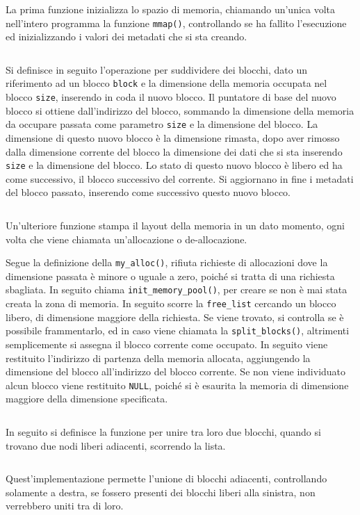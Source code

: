 \documentclass{article}
\numberwithin{equation}{subsection}
\begin{document}
La prima funzione inizializza lo spazio di memoria, chiamando un'unica volta nell'intero programma la funzione \verb|mmap()|, controllando se ha fallito l'esecuzione ed inizializzando 
i valori dei metadati che si sta creando. 
\inputminted[firstline=30,lastline=44,breaklines, breakanywhere]{c}{./Esercitazione del 19-11-24/domanda4.c}

Si definisce in seguito l'operazione per suddividere dei blocchi, dato un riferimento ad un blocco \verb|block| e la dimensione della memoria occupata nel blocco \verb|size|, inserendo in coda il nuovo blocco.  
Il puntatore di base del nuovo blocco si ottiene dall'indirizzo del blocco, sommando la dimensione della memoria da occupare passata come parametro \verb|size| e la dimensione del blocco. La dimensione di questo nuovo blocco è la dimensione rimasta, dopo aver rimosso dalla dimensione corrente del blocco la dimensione dei dati che si sta inserendo \verb|size| e la dimensione del blocco. Lo stato di questo nuovo blocco è libero ed ha come successivo, il blocco 
successivo del corrente. Si aggiornano in fine i metadati del blocco passato, inserendo come successivo questo nuovo blocco. 
\inputminted[firstline=47,lastline=56]{c}{./Esercitazione del 19-11-24/domanda4.c}


Un'ulteriore funzione stampa il layout della memoria in un dato momento, ogni volta che viene 
chiamata un'allocazione o de-allocazione. 

Segue la definizione della \verb|my_alloc()|, rifiuta richieste di allocazioni dove la dimensione passata è minore o uguale a zero, poiché si tratta di una richiesta sbagliata. In seguito chiama \verb|init_memory_pool()|, per creare se non è mai stata creata la zona di memoria. 
In seguito scorre la \verb|free_list| cercando un blocco libero, di dimensione maggiore della richiesta. Se viene trovato, si controlla se è possibile frammentarlo, ed in caso viene chiamata la \verb|split_blocks()|, altrimenti semplicemente si assegna il blocco corrente come occupato. 
In seguito viene restituito l'indirizzo di partenza della memoria allocata, aggiungendo la dimensione del blocco all'indirizzo del blocco corrente. 
Se non viene individuato alcun blocco viene restituito \verb|NULL|, poiché si è esaurita la memoria di dimensione maggiore della dimensione specificata. 
\inputminted[firstline=70,lastline=89]{c}{./Esercitazione del 19-11-24/domanda4.c}

In seguito si definisce la funzione per unire tra loro due blocchi, quando si trovano due nodi 
liberi adiacenti, scorrendo la lista. 
\inputminted[firstline=91,lastline=96]{c}{./Esercitazione del 19-11-24/domanda4.c}
Quest'implementazione permette l'unione di blocchi adiacenti, controllando solamente a destra, se fossero presenti dei blocchi liberi alla sinistra, non verrebbero uniti tra di loro. 
\end{document}

